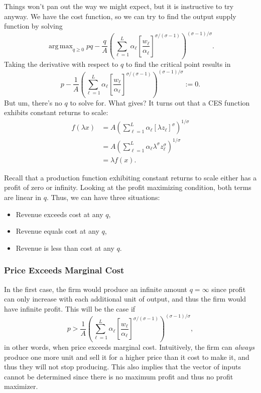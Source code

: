 \documentclass[12pt]{article}
\DeclareMathOperator*{\argmax}{arg\,max}
\theoremstyle{definition}
\begin{document}
Things won't pan out the way we might expect, but it is instructive to try anyway. We have the cost function, so we can try to find the output supply function by solving
	\[	\argmax_{q \geq 0} pq	 - \frac{q}{A}  \left( \sum_{\ell=1}^L \alpha_{\ell} \left[ \frac{w_{\ell}}{\alpha_{\ell}} \right]^{\sigma / (\sigma - 1)} \right)^{(\sigma  - 1)/\sigma}.	\]
Taking the derivative with respect to $q$ to find the critical point results in
	\[ p -  \frac{1}{A}  \left( \sum_{\ell=1}^L \alpha_{\ell} \left[ \frac{w_{\ell}}{\alpha_{\ell}} \right]^{\sigma / (\sigma - 1)} \right)^{(\sigma  - 1)/\sigma} :=0. \]
But um, there's no $q$ to solve for. What gives? It turns out that a CES function exhibits constant returns to scale:
\begin{align*}
	f(\lambda x) &= 	 A \left(\sum_{\ell = 1}^L \alpha_{\ell} [\lambda z_{\ell}]^{\sigma} \right)^{1 / \sigma} \\	
		& = A \left(\sum_{\ell = 1}^L \alpha_{\ell} \lambda^{\sigma} z_{\ell}^{\sigma} \right)^{1 / \sigma} \\	
		& = \lambda f(x).
\end{align*}

Recall that a production function exhibiting constant returns to scale either has a profit of zero or infinity. Looking at the profit maximizing condition, both terms are linear in $q$. Thus, we can have three situations:
\begin{itemize}
	\itemsep0em
	\item Revenue exceeds cost at any $q$,
	\item Revenue equals cost at any $q$,
	\item Revenue is less than cost at any $q$. 
\end{itemize}


\subsubsection{Price Exceeds Marginal Cost}
In the first case, the firm would produce an infinite amount $q= \infty$ since profit can only increase with each additional unit of output, and thus the firm would have infinite profit. This will be the case if 
	\[
		 p >  \frac{1}{A}  \left( \sum_{\ell=1}^L \alpha_{\ell} \left[ \frac{w_{\ell}}{\alpha_{\ell}} \right]^{\sigma / (\sigma - 1)} \right)^{(\sigma  - 1)/\sigma},
	\]
in other words, when price exceeds marginal cost. Intuitively, the firm can \emph{always} produce one more unit and sell it for a higher price than it cost to make it, and thus they will not stop producing. This also implies that the vector of inputs cannot be determined since there is no maximum profit and thus no profit maximizer. 
\end{document}
